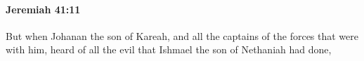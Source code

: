 
		\paragraph{Jeremiah 41:11} %
			\label{JEREMIAH-41-11}

			But when Johanan the son of Kareah, and all the captains of the forces that were with him, heard of all the evil that Ishmael the son of Nethaniah had done,


